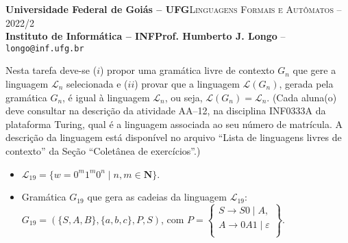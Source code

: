 \documentclass[12pt]{article}
\def\discente{Rafael Nunes Moreira Costa}
\def\matricula{202107855}
\def\ua{12}
\def\myling{{19}} %
\begin{document}
 \begin{tcolorbox}[rounded corners, colback=blue!3, colframe=blue!40!black]
  \footnotesize\textbf{Universidade Federal de Goiás -- UFG}\hfill \textsc{Linguagens Formais e Autômatos -- 2022/2}\\
  \footnotesize\textbf{Instituto de Informática -- INF\hfill Prof. Humberto J. Longo} -- \scriptsize\texttt{longo@inf.ufg.br}
 \end{tcolorbox}\bigskip
%
\begin{tcolorbox}[rounded corners, colback=blue!2, colframe=blue!40!black, title=\textbf{Atividade AA-\ua}]
  Nesta tarefa deve-se ($i$) propor uma gramática livre de contexto $G_n$ que gere a linguagem $\mathcal{L}_n$ selecionada e ($ii$) provar que a linguagem $\mathcal{L}(G_n)$, gerada pela gramática $G_n$, é igual à linguagem $\mathcal{L}_n$, ou seja, $\mathcal{L}(G_n)=\mathcal{L}_n$. (Cada aluna(o) deve consultar na descrição da atividade AA--\ua, na disciplina INF0333A da plataforma Turing, qual é a linguagem associada ao seu número de matrícula. A descrição da linguagem está disponível no arquivo ``Lista de linguagens livres de contexto'' da Seção ``Coletânea de exercícios''.)
\end{tcolorbox}\bigskip

%
\begin{tcolorbox}[rounded corners, colback=yellow!5, colframe=red!40!black, title={\discente\ (\matricula)}]
\begin{itemize}
  \item $\mathcal{L}_{\myling} =  \{w = 0^m1^m0^n \mid n,m \in \mathbf{N}\}$.
  \item Gramática $G_{\myling}$ que gera as cadeias da linguagem $\mathcal{L}_{\myling}$:\\ $G_{\myling}=(\{S,A,B\},\{a,b,c\},P,S)$, com
  $
   P =
   \left\{\begin{array}{l}
    S\to S0\mid A,           \\
    A\to 0A1\mid \varepsilon \\
   \end{array}\right\}.
  $
 \end{itemize}
\end{tcolorbox}\bigskip
\end{document}
